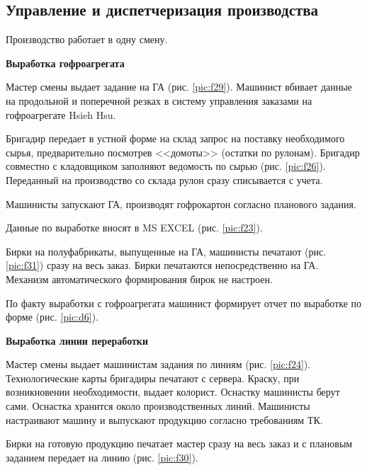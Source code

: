 \clearpage


\newpage
\subsection{Управление и диспетчеризация производства}
\label{bp:production}



Производство работает в одну смену. 





\textbf{Выработка гофроагрегата}


Мастер смены выдает задание на ГА (рис. \ref{pic:f29}). Машинист вбивает данные на продольной и поперечной резках в систему управления заказами на гофроагрегате Hsieh Hsu.

Бригадир передает в устной форме на склад запрос на поставку необходимого сырья, предварительно посмотрев <<домоты>> (остатки по рулонам). Бригадир совместно с кладовщиком заполняют ведомость по сырью (рис. \ref{pic:f26}). Переданный на производство со склада рулон сразу списывается с учета.


Машинисты запускают ГА, производят гофрокартон согласно  планового задания. 

Данные по выработке вносят в MS EXCEL (рис. \ref{pic:f23}).

Бирки на полуфабрикаты, выпущенные на ГА, машинисты печатают (рис. \ref{pic:f31}) сразу на весь заказ. Бирки печатаются непосредственно на ГА. Механизм автоматического формирования бирок не настроен.

По факту выработки с гофроагрегата машинист формирует отчет по выработке по форме (рис. \ref{pic:d6}).




\textbf{Выработка линии переработки}

Мастер смены выдает машинистам задания по линиям (рис. \ref{pic:f24}). Технологические карты бригадиры печатают с сервера. 
Краску, при возникновении необходимости, выдает колорист.
Оснастку машинисты берут сами. Оснастка хранится около производственных линий.
Машинисты настраивают машину и выпускают продукцию согласно требованиям ТК.


Бирки на готовую продукцию печатает мастер сразу на весь заказ и с плановым заданием передает на линию (рис. \ref{pic:f30}).

